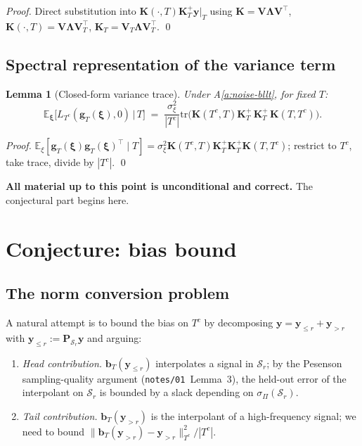 \documentclass[11pt,a4paper]{article}
\theoremstyle{plain}
\newtheorem{lemma}[theorem]{Lemma}
\theoremstyle{definition}
\theoremstyle{remark}
\newcommand{\by}{\mathbf{y}}
\newcommand{\bxi}{\boldsymbol{\xi}}
\newcommand{\bP}{\mathbf{P}}
\newcommand{\bK}{\mathbf{K}}
\newcommand{\bV}{\mathbf{V}}
\newcommand{\bLambda}{\boldsymbol{\Lambda}}
\newcommand{\bg}{\mathbf{g}}
\newcommand{\bb}{\mathbf{b}}
\newcommand{\E}{\mathbb{E}}
\newcommand{\Scal}{\mathcal{S}}
\newcommand{\tr}{\mathrm{tr}}
\begin{document}
\begin{proof}
Direct substitution into $\bK(\cdot, T)\bK_T^+ \by|_T$ using
$\bK = \bV\bLambda\bV^\top$, $\bK(\cdot, T) = \bV\bLambda\bV_T^\top$,
$\bK_T = \bV_T\bLambda\bV_T^\top$. \qed
\end{proof}

\subsection{Spectral representation of the variance term}

\begin{lemma}[Closed-form variance trace]
\label{lem:var-spectral-rep}
Under A\ref{a:noise-bllt}, for fixed $T$:
\begin{equation}
    \E_\bxi\!\big[L_{T^c}(\bg_T(\bxi), 0) \,|\, T\big]
    \;=\; \frac{\sigma_\xi^2}{|T^c|} \tr\!\Big(\bK(T^c, T)\bK_T^+\, \bK_T^+\, \bK(T, T^c)\Big).
    \label{eq:var-rep}
\end{equation}
\end{lemma}

\begin{proof}
$\E_\xi[\bg_T(\bxi)\bg_T(\bxi)^\top \mid T]
= \sigma_\xi^2 \bK(T^c, T)\bK_T^+\bK_T^+\bK(T, T^c)$; restrict to
$T^c$, take trace, divide by $|T^c|$. \qed
\end{proof}

\textbf{All material up to this point is unconditional and correct.}
The conjectural part begins here.

\section{Conjecture: bias bound}
\label{sec:bias-conjecture}

\subsection{The norm conversion problem}

A natural attempt is to bound the bias on $T^c$ by decomposing
$\by = \by_{\le r} + \by_{>r}$ with $\by_{\le r} := \bP_{\Scal_r}\by$
and arguing:
\begin{enumerate}[label=(\alph*),leftmargin=*]
\item \emph{Head contribution.} $\bb_T(\by_{\le r})$ interpolates
    a signal in $\Scal_r$; by the Pesenson sampling-quality
    argument (\texttt{notes/01}~Lemma~3), the held-out error of
    the interpolant on $\Scal_r$ is bounded by a slack
    depending on $\sigma_\Pi(\Scal_r)$.
\item \emph{Tail contribution.} $\bb_T(\by_{>r})$ is the
    interpolant of a high-frequency signal; we need to bound
    $\|\bb_T(\by_{>r}) - \by_{>r}\|_{T^c}^2/|T^c|$.
\end{enumerate}
\end{document}
